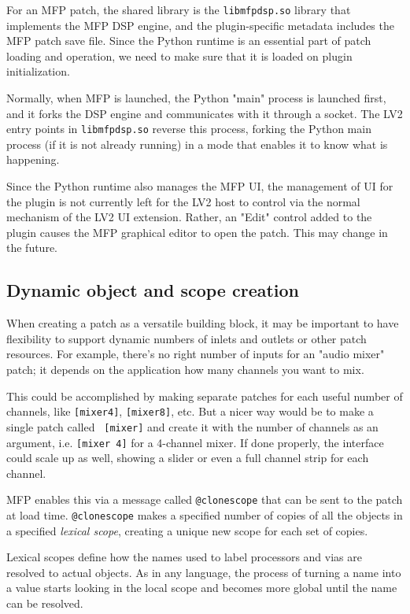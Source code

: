 \documentclass[a4paper]{article}
\def\:{\hskip0pt}
\begin{document}
For an MFP patch, the shared library is the {\tt libmfpdsp.so}
library that implements the MFP DSP engine, and the
plugin\:-\:specific metadata includes the MFP patch save file. Since
the Python runtime is an essential part of patch loading and
operation, we need to make sure that it is loaded on plugin
initialization.

Normally, when MFP is launched, the Python "main" process is
launched first, and it forks the DSP engine and communicates with
it through a socket. The LV2 entry points in {\tt libmfpdsp.so}
reverse this process, forking the Python main process (if it is
not already running) in a mode that enables it to know what is
happening.

Since the Python runtime also manages the MFP UI, the management
of UI for the plugin is not currently left for the LV2 host to
control via the normal mechanism of the LV2 UI extension. Rather,
an "Edit" control added to the plugin causes the MFP graphical editor to
open the patch. This may change in the future.


\subsection{Dynamic object and scope creation}

When creating a patch as a versatile building block, it may be
important to have flexibility to support dynamic numbers of
inlets and outlets or other patch resources. For example, there's
no right number of inputs for an "audio mixer" patch; it depends
on the application how many channels you want to mix.

This could be accomplished by making separate patches for each
useful number of channels, like {\tt [mixer4]}, {\tt [mixer8]},
etc. But a nicer way would be to make a single patch called {\tt
[mixer]} and create it with the number of channels as an
argument, i.e. {\tt [mixer 4]} for a 4-channel mixer. If done
properly, the interface could scale up as well, showing a slider
or even a full channel strip for each channel.

MFP enables this via a message called {\tt @clonescope}
that can be sent to the patch at load time. {\tt @clonescope}
makes a specified number of copies of all the objects in a
specified {\it lexical scope}, creating a unique new scope for
each set of copies.

Lexical scopes define how the names used to label processors and
vias are resolved to actual objects. As in any language, the
process of turning a name into a value starts looking in the
local scope and becomes more global until the name can be
resolved.
\end{document}
